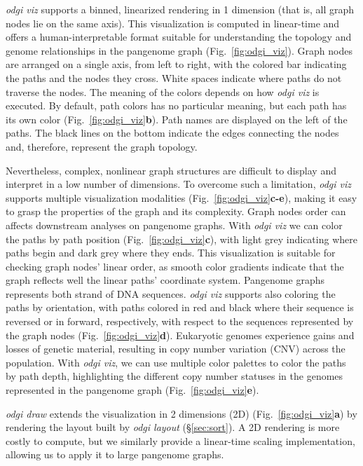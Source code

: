\documentclass{bioinfo}
\begin{document}
\textit{odgi viz} supports a binned, linearized rendering in 1 dimension (that is, all graph nodes lie on the same axis).
This visualization is computed in linear-time and offers a human-interpretable format suitable for understanding the topology and genome relationships in the pangenome graph (Fig.~\ref{fig:odgi_viz}).
Graph nodes are arranged on a single axis, from left to right, with the colored bar indicating the paths and the nodes they cross.
White spaces indicate where paths do not traverse the nodes.
The meaning of the colors depends on how \textit{odgi viz} is executed.
By default, path colors has no particular meaning, but each path has its own color (Fig.~\ref{fig:odgi_viz}\textbf{b}).
Path names are displayed on the left of the paths.
The black lines on the bottom indicate the edges connecting the nodes and, therefore, represent the graph topology.

Nevertheless, complex, nonlinear graph structures are difficult to display and interpret in a low number of dimensions.
To overcome such a limitation, \textit{odgi viz} supports multiple visualization modalities (Fig.~\ref{fig:odgi_viz}\textbf{c-e}), making it easy to grasp the properties of the graph and its complexity.
Graph nodes order can affects downstream analyses on pangenome graphs.
With \textit{odgi viz} we can color the paths by path position (Fig.~\ref{fig:odgi_viz}\textbf{c}), with light grey indicating where paths begin and dark grey where they ends.
This visualization is suitable for checking graph nodes' linear order, as smooth color gradients indicate that the graph reflects well the linear paths' coordinate system.
Pangenome graphs represents both strand of DNA sequences.
\textit{odgi viz} supports also coloring the paths by orientation, with paths colored in red and black where their sequence is reversed or in forward, respectively, with respect to the sequences represented by the graph nodes (Fig.~\ref{fig:odgi_viz}\textbf{d}).
Eukaryotic genomes experience gains and losses of genetic material, resulting in copy number variation (CNV) across the population.
With \textit{odgi viz}, we can use multiple color palettes to color the paths by path depth, highlighting the different copy number statuses in the genomes represented in the pangenome graph (Fig.~\ref{fig:odgi_viz}\textbf{e}).

\textit{odgi draw} extends the visualization in 2 dimensions (2D)  (Fig.~\ref{fig:odgi_viz}\textbf{a}) by rendering the layout built by \textit{odgi layout} (\S\ref{sec:sort}).
A 2D rendering is more costly to compute, but we similarly provide a linear-time scaling implementation, allowing us to apply it to large pangenome graphs.
\end{document}
